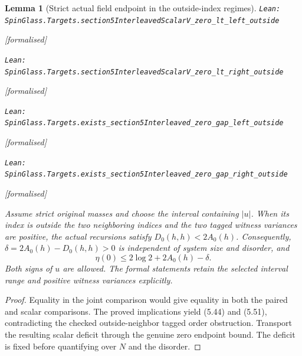 \documentclass[11pt]{article}
\providecommand{\lean}[1]{\leavevmode\par\nopagebreak
  {\noindent\normalfont\footnotesize\raggedright\texttt{Lean: #1}\par}\nopagebreak}
\providecommand{\leanok}{\par\nopagebreak
  {\noindent\normalfont\footnotesize\textcolor{green!50!black}{[formalised]}\par}\nopagebreak}
\newtheorem{lemma}[theorem]{Lemma}
\begin{document}
\begin{lemma}[Strict actual field endpoint in the outside-index regimes]
\lean{SpinGlass.Targets.section5InterleavedScalarV\_zero\_lt\_left\_outside}\leanok
\lean{SpinGlass.Targets.section5InterleavedScalarV\_zero\_lt\_right\_outside}\leanok
\lean{SpinGlass.Targets.exists\_section5Interleaved\_zero\_gap\_left\_outside}\leanok
\lean{SpinGlass.Targets.exists\_section5Interleaved\_zero\_gap\_right\_outside}\leanok
Assume strict original masses and choose the interval containing $|u|$.
When its index is outside the two neighboring indices and the two tagged
witness variances are positive, the actual recursions satisfy
$D_0(h,h)<2A_0(h)$. Consequently, $\delta=2A_0(h)-D_0(h,h)>0$ is independent
of system size and disorder, and
\[
 \eta(0)\le2\log2+2A_0(h)-\delta.
\]
Both signs of $u$ are allowed. The formal statements retain the selected
interval range and positive witness variances explicitly.
\end{lemma}
\begin{proof}
Equality in the joint comparison would give equality in both the paired
and scalar comparisons. The proved implications yield (5.44) and (5.51),
contradicting the checked outside-neighbor tagged order obstruction.
Transport the resulting scalar deficit through the genuine zero endpoint
bound. The deficit is fixed before quantifying over $N$ and the disorder.
\end{proof}
\end{document}
